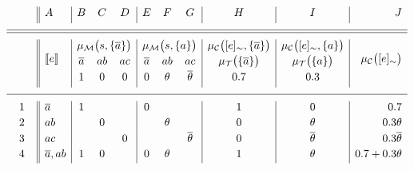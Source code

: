 \documentclass[x11names]{tlp}
\begin{document}
\ifExamples
	\begin{example}\label{ex:measures.sm}\em
		\begin{equation*}
			\begin{array}{c||l|ccc|ccc|c|c|r}
				  &
				A & B                                         & C      & D           & E & F & G & H & I & J
				\\[3pt]
				\hline
				\hline
				\multirow{3}{*}{\phantom{2em}}
				  & \multirow{3}{*}{\stablecore{e}}
				  & \multicolumn{3}{c|}{\pwm{s,\set{\co{a}}}}
				  & \multicolumn{3}{c|}{\pwm{s,\set{a}}}
				  & \pwc{\class{e},\set{\co{a}}}
				  & \pwc{\class{e},\set{a}}
				  & \multirow{3}{*}{\pwc{\class{e}}}
				\\[2pt]
				  &
				  & \co{a}                                    & ab     & ac
				  & \co{a}                                    & ab     & ac
				  & \pwt{\set{\co{a}}}
				  & \pwt{\set{a}}
				  &
				\\[2pt]
				  &
				  & 1                                         & 0      & 0
				  & 0                                         & \theta & \co{\theta}
				  & 0.7
				  & 0.3
				  &
				\\[3pt]
				\hline
				1
				  & \co{a}
				  & 1                                         &        &
				  & 0                                         &        &
				  & 1
				  & 0
				  & 0.7
				\\[2pt]
				2
				  & ab
				  &                                           & 0      &
				  &                                           & \theta &
				  & 0
				  & \theta
				  & 0.3\theta
				\\[2pt]
				3
				  & ac
				  &                                           &        & 0
				  &                                           &        & \co{\theta}
				  & 0
				  & \co{\theta}
				  & 0.3\co{\theta}
				\\[2pt]
				4
				  & \co{a}, ab
				  & 1                                         & 0      &
				  & 0                                         & \theta &
				  & 1
				  & \theta
				  & 0.7 + 0.3\theta
				\\[2pt]

\end{array}
\end{equation*}
\end{example}
\end{document}
